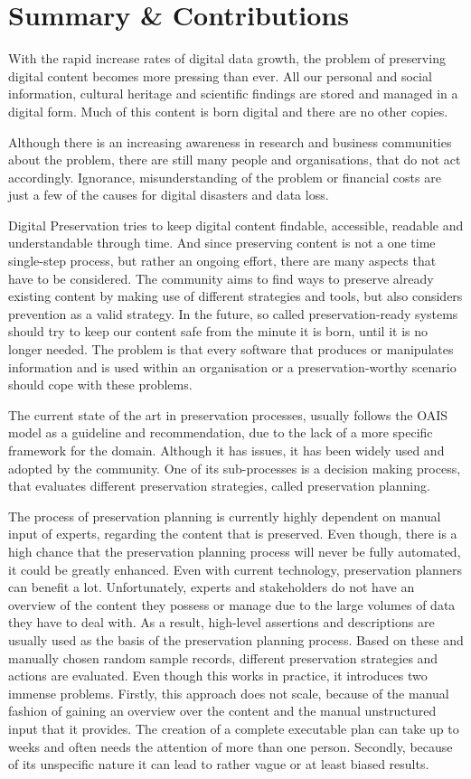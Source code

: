 \section{Summary \& Contributions}
With the rapid increase rates of digital data growth, the problem of preserving digital content becomes more pressing than ever.
All our personal and social information, cultural heritage and scientific findings are stored and managed in a digital form.
Much of this content is born digital and there are no other copies.

Although there is an increasing awareness in research and business communities about the problem, there are still many people and organisations, that do not act accordingly.
Ignorance, misunderstanding of the problem or financial costs are just a few of the causes for digital disasters and data loss.

Digital Preservation tries to keep digital content findable, accessible, readable and understandable through time.
And since preserving content is not a one time single-step process, but rather an ongoing effort, there are many aspects that have to be considered.
The community aims to find ways to preserve already existing content by making use of different strategies and tools, but also considers prevention as a valid strategy.
In the future, so called preservation-ready systems should try to keep our content safe from the minute it is born, until it is no longer needed. The problem is that every software that produces or manipulates information and is used within an organisation or a preservation-worthy scenario should cope with these problems.

The current state of the art in preservation processes, usually follows the OAIS model as a guideline and recommendation, due to the lack of a more specific framework for the domain.
Although it has issues, it has been widely used and adopted by the community.
One of its sub-processes is a decision making process, that evaluates different preservation strategies, called preservation planning.

The process of preservation planning is currently highly dependent on manual input of experts, regarding the content that is preserved.
Even though, there is a high chance that the preservation planning process will never be fully automated, it could be greatly enhanced. Even with current technology, preservation planners can benefit a lot.
Unfortunately, experts and stakeholders do not have an overview of the content they possess or manage due to the large volumes of data they have to deal with.
As a result, high-level assertions and descriptions are usually used as the basis of the preservation planning process.
Based on these and manually chosen random sample records, different preservation strategies and actions are evaluated.
Even though this works in practice, it introduces two immense problems.
Firstly, this approach does not scale, because of the manual fashion of gaining an overview over the content and the manual unstructured input that it provides.
The creation of a complete executable plan can take up to weeks and often needs the attention of more than one person.
Secondly, because of its unspecific nature it can lead to rather vague or at least biased results.


